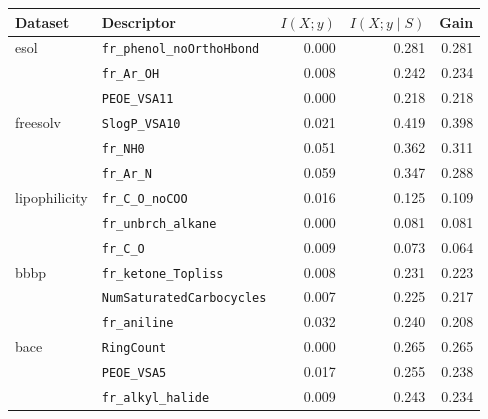 \begin{tabular}{llrrr}
\toprule
Dataset & Descriptor & $I(X;y)$ & $I(X;y\mid S)$ & Gain \\
\midrule
esol & \texttt{fr\_phenol\_noOrthoHbond} & 0.000 & 0.281 & 0.281 \\
 & \texttt{fr\_Ar\_OH} & 0.008 & 0.242 & 0.234 \\
 & \texttt{PEOE\_VSA11} & 0.000 & 0.218 & 0.218 \\
\midrule
freesolv & \texttt{SlogP\_VSA10} & 0.021 & 0.419 & 0.398 \\
 & \texttt{fr\_NH0} & 0.051 & 0.362 & 0.311 \\
 & \texttt{fr\_Ar\_N} & 0.059 & 0.347 & 0.288 \\
\midrule
lipophilicity & \texttt{fr\_C\_O\_noCOO} & 0.016 & 0.125 & 0.109 \\
 & \texttt{fr\_unbrch\_alkane} & 0.000 & 0.081 & 0.081 \\
 & \texttt{fr\_C\_O} & 0.009 & 0.073 & 0.064 \\
\midrule
bbbp & \texttt{fr\_ketone\_Topliss} & 0.008 & 0.231 & 0.223 \\
 & \texttt{NumSaturatedCarbocycles} & 0.007 & 0.225 & 0.217 \\
 & \texttt{fr\_aniline} & 0.032 & 0.240 & 0.208 \\
\midrule
bace & \texttt{RingCount} & 0.000 & 0.265 & 0.265 \\
 & \texttt{PEOE\_VSA5} & 0.017 & 0.255 & 0.238 \\
 & \texttt{fr\_alkyl\_halide} & 0.009 & 0.243 & 0.234 \\
\bottomrule
\end{tabular}